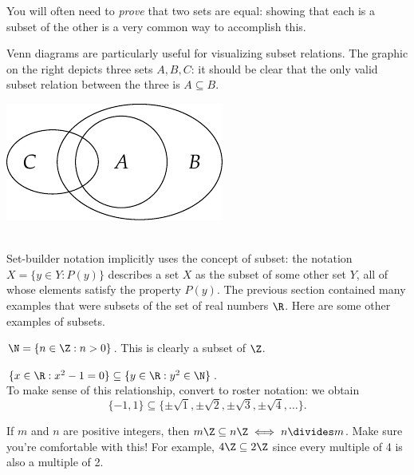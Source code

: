 \noindent You will often need to \emph{prove} that two sets are equal: showing that each is a subset of the other is a very common way to accomplish this.

\noindent\begin{minipage}{0.63\textwidth}
Venn diagrams are particularly useful for visualizing subset relations. The graphic on the right depicts three sets $A,B,C$: it should be clear that the only valid subset relation between the three is $A\subseteq B$.
\end{minipage}\qquad
\begin{minipage}{0.26\textwidth}
\includegraphics[width=\textwidth]{sets-02-vennsubset}
\end{minipage}\\

Set-builder notation implicitly uses the concept of subset: the notation $X=\{y\in Y:P(y)\}$ describes a set $X$ as the subset of some other set $Y$, all of whose elements satisfy the property $P(y)$. The previous section contained many examples that were subsets of the set of real numbers $\R$. Here are some other examples of subsets.

\begin{examples}
  \item $\N=\{n\in\Z:n>0\}$. This is clearly a subset of $\Z$.
  \item $\{x\in\R:x^2-1=0\}\subseteq \{y\in\R:y^2\in\N\}$.\\
  To make sense of this relationship, convert to roster notation: we obtain
  \[\{-1,1\}\subseteq\{\pm\sqrt 1,\pm\sqrt 2,\pm\sqrt 3,\pm\sqrt 4,\ldots\}.\]
  \item If $m$ and $n$ are positive integers, then $m\Z\subseteq n\Z\iff n\divides m$. Make sure you're comfortable with this! For example, $4\Z\subseteq 2\Z$ since every multiple of 4 is also a multiple of 2.
\end{examples}\pagebreak

